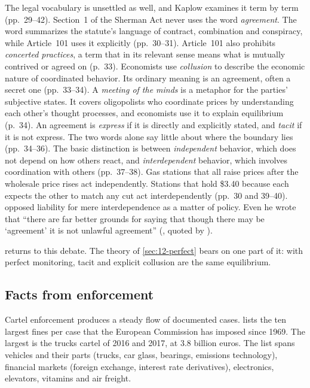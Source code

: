 The legal vocabulary is unsettled as well, and Kaplow examines it term by term (pp.~29--42). Section~1 of the
Sherman Act never uses the word \emph{agreement}. The word summarizes the statute's language of contract,
combination and conspiracy, while Article~101 uses it explicitly (pp.~30--31). Article~101 also prohibits
\emph{concerted practices}, a term that in its relevant sense means what is mutually contrived or agreed on (p.~33).
Economists use \emph{collusion} to describe the economic nature of coordinated behavior. Its ordinary meaning is an
agreement, often a secret one (pp.~33--34). A \emph{meeting of the minds} is a metaphor for the parties' subjective
states. It covers oligopolists who coordinate prices by understanding each other's thought processes, and
economists use it to explain equilibrium (p.~34). An agreement is \emph{express} if it is directly and explicitly
stated, and \emph{tacit} if it is not express. The two words alone say little about where the boundary lies
(pp.~34--36). The basic distinction is between \emph{independent} behavior, which does not depend on how others
react, and \emph{interdependent} behavior, which involves coordination with others (pp.~37--38). Gas stations that
all raise prices after the wholesale price rises act independently. Stations that hold \$3.40 because each expects
the other to match any cut act interdependently (pp.~30 and 39--40). \citet{Turner1962} opposed liability for mere
interdependence as a matter of policy. Even he wrote that ``there are far better grounds for saying that though
there may be `agreement' it is not unlawful agreement'' (\citealp[p.~671]{Turner1962}, quoted by
\citealp[p.~32]{Kaplow2013}).

 returns to this debate. The theory of \cref{sec:12-perfect} bears on one part of it: with
perfect monitoring, tacit and explicit collusion are the same equilibrium.

\subsection{Facts from enforcement}\label{sec:12-eu-facts}

Cartel enforcement produces a steady flow of documented cases.  lists the ten largest fines
per case that the European Commission has imposed since 1969. The largest is the trucks cartel of 2016 and 2017, at
3.8 billion euros. The list spans vehicles and their parts (trucks, car glass, bearings, emissions technology),
financial markets (foreign exchange, interest rate derivatives), electronics, elevators, vitamins and air freight.

